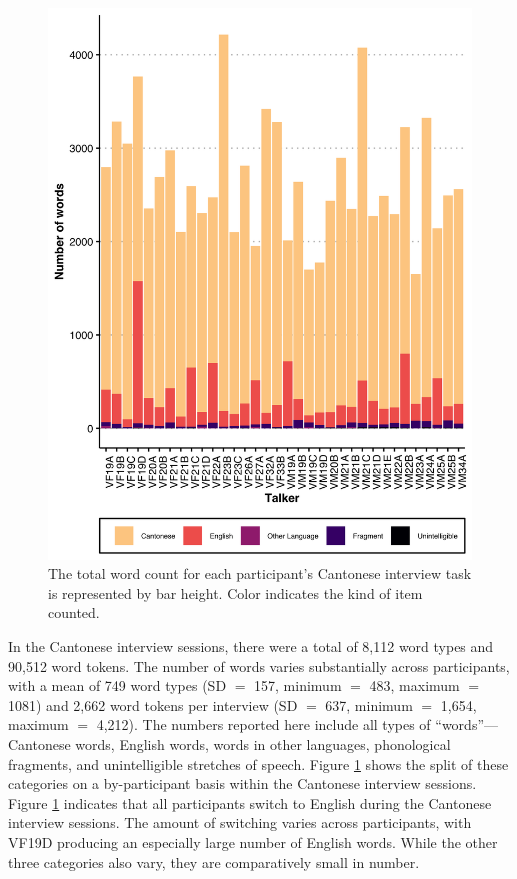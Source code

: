 \begin{figure}[!htbp]
  \begin{center}
  \includegraphics[width=4.9in]{figures/ch2_cantonesetypecounts_5in.png} 
  \caption{The total word count for each participant's Cantonese interview task is represented by bar height. Color indicates the kind of item counted. }
  \label{ch2:fig:cantonesetypecounts}
  \end{center}
\end{figure}

In the Cantonese interview sessions, there were a total of 8,112 word types and 90,512 word tokens. The number of words varies substantially across participants, with a mean of 749 word types (SD $=$ 157, minimum $=$ 483, maximum $=$ 1081) and 2,662 word tokens per interview (SD $=$ 637, minimum $=$ 1,654, maximum $=$ 4,212). The numbers reported here include all types of ``words''---Cantonese words, English words, words in other languages, phonological fragments, and unintelligible stretches of speech. Figure \ref{ch2:fig:cantonesetypecounts} shows the split of these categories on a by-participant basis within the Cantonese interview sessions. Figure \ref{ch2:fig:cantonesetypecounts} indicates that all participants switch to English during the Cantonese interview sessions. The amount of switching varies across participants, with VF19D producing an especially large number of English words. While the other three categories also vary, they are comparatively small in number. 

